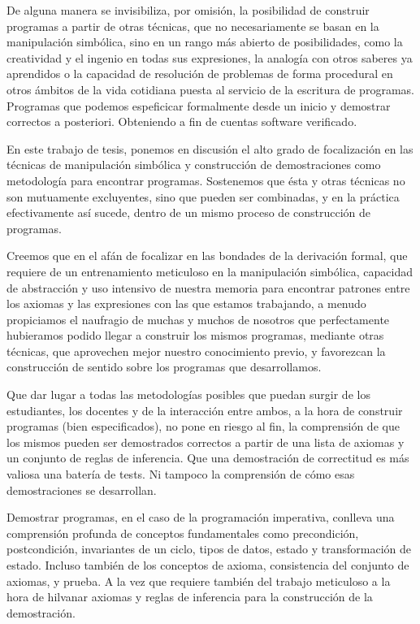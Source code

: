 \documentclass[12pt, a4paper, openany, fleqn]{book}
\begin{document}
    De alguna manera se invisibiliza, por omisión, la posibilidad de construir programas a partir de otras técnicas, que no necesariamente se basan en la manipulación simbólica, sino en un rango más abierto de posibilidades, como la creatividad y el ingenio en todas  sus expresiones, la analogía con otros saberes ya aprendidos o la capacidad de resolución de problemas de forma procedural en otros ámbitos de la vida cotidiana puesta al servicio de la escritura de programas. Programas que podemos espeficicar formalmente desde un inicio y demostrar correctos a posteriori. Obteniendo a fin de cuentas software verificado.

    En este trabajo de tesis, ponemos en discusión el alto grado de focalización en las técnicas de manipulación simbólica y construcción de demostraciones como metodología para encontrar programas. Sostenemos que ésta y otras técnicas no son mutuamente excluyentes, sino que pueden ser combinadas, y en la práctica efectivamente así sucede, dentro de un mismo proceso de construcción de programas.

    Creemos que en el afán de focalizar en las bondades de la derivación formal, que requiere de un entrenamiento meticuloso en la manipulación simbólica, capacidad de abstracción y uso intensivo de nuestra memoria para encontrar patrones entre los axiomas y las expresiones con las que estamos trabajando, a menudo propiciamos el naufragio de muchas y muchos de nosotros que perfectamente hubieramos podido llegar a construir los mismos programas, mediante otras técnicas, que aprovechen mejor nuestro conocimiento previo, y favorezcan la construcción de sentido sobre los programas que desarrollamos.

    Que dar lugar a todas las metodologías posibles que puedan surgir de los estudiantes, los docentes y de la interacción entre ambos, a la hora de construir programas (bien especificados), no pone en riesgo al fin, la comprensión de que los mismos pueden ser demostrados correctos a partir de una lista de axiomas y un conjunto de reglas de inferencia. Que una demostración de correctitud es más valiosa una batería de tests. Ni tampoco la comprensión de cómo esas demostraciones se desarrollan.

    Demostrar programas, en el caso de la programación imperativa, conlleva una comprensión profunda de conceptos fundamentales como precondición, postcondición, invariantes de un ciclo, tipos de datos, estado y transformación de estado. Incluso también de los conceptos de axioma, consistencia del conjunto de axiomas, y prueba.
    A la vez que requiere también del trabajo meticuloso a la hora de hilvanar axiomas y reglas de inferencia para la construcción de la demostración.
\end{document}
